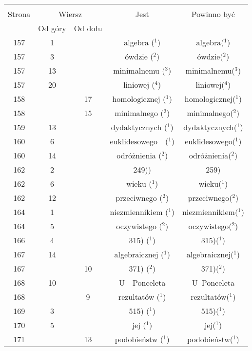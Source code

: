 \documentclass[a4paper,11pt]{article}
\begin{document}
\begin{center}
  \begin{tabular}{|c|c|c|c|c|}
    \hline
    & \multicolumn{2}{c|}{} & & \\
    Strona & \multicolumn{2}{c|}{Wiersz} & Jest
                              & Powinno być \\ \cline{2-3}
    & Od góry & Od dołu & & \\
    \hline
    157 &  1 & & algebra ($^{ 1 }$) & algebra($^{ 1 }$) \\
    157 &  3 & & ówdzie ($^{ 2 }$) & ówdzie($^{ 2 }$) \\
    157 & 13 & & minimalnemu ($^{ 3 }$) & minimalnemu($^{ 3 }$) \\
    157 & 20 & & liniowej ($^{ 4 }$) & liniowej($^{ 4 }$) \\
    158 & & 17 & homologicznej ($^{ 1 }$) & homologicznej($^{ 1 }$) \\
    158 & & 15 & minimalnego ($^{ 2 }$) & minimalnego($^{ 2 }$) \\
    159 & 13 & & dydaktycznych ($^{ 1 }$) & dydaktycznych($^{ 1 }$) \\
    160 &  6 & & euklidesowego~~($^{ 1 }$) & euklidesowego($^{ 1 }$) \\
    160 & 14 & & odróżnienia ($^{ 2 }$) & odróżnienia($^{ 2 }$) \\
    162 &  2 & & 249)) & 259) \\
    162 &  6 & & wieku ($^{ 1 }$) & wieku($^{ 1 }$) \\
    162 & 12 & & przeciwnego ($^{ 2 }$) & przeciwnego($^{ 2 }$) \\
    164 &  1 & & niezmiennikiem ($^{ 1 }$) & niezmiennikiem($^{ 1 }$) \\
    164 &  5 & & oczywistego ($^{ 2 }$) & oczywistego($^{ 2 }$) \\
    166 &  4 & & 315) ($^{ 1 }$) & 315)($^{ 1 }$) \\
    167 & 14 & & algebraicznej ($^{ 1 }$) & algebraicznej($^{ 1 }$) \\
    167 & & 10 & 371) ($^{ 2 }$) & 371)($^{ 2 }$) \\
    168 & 10 & & U~~Ponceleta & U~Ponceleta \\
    168 & &  9 & rezultatów ($^{ 1 }$) & rezultatów($^{ 1 }$) \\
    169 &  3 & & 515) ($^{ 1 }$) & 515)($^{ 1 }$) \\
    170 &  5 & & jej ($^{ 1 }$) & jej($^{ 1 }$) \\
    171 & & 13 & podobieństw ($^{ 1 }$) & podobieństw($^{ 1 }$) \\

\end{tabular}
\end{center}
\end{document}
